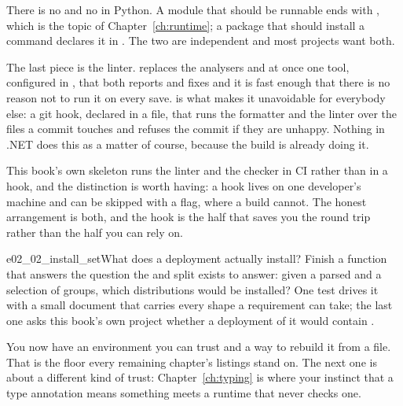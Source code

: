 \begin{csbox}
There is no  and no  in Python. A module that
should be runnable ends with , which
is the topic of Chapter~\ref{ch:runtime}; a package that should install a
command declares it in . The two are independent and
most projects want both.
\end{csbox}

\noindent
The last piece is the linter.  replaces the analysers and
 at once \dash{} one tool, configured in
, that both reports and fixes \dash{} and it is fast
enough that there is no reason not to run it on every save. 
is what makes it unavoidable for everybody else: a git hook, declared in a
file, that runs the formatter and the linter over the files a commit touches
and refuses the commit if they are unhappy. Nothing in .NET does this as a
matter of course, because the build is already doing it.

This book's own skeleton runs the linter and the checker in CI rather than in
a hook, and the distinction is worth having: a hook lives on one developer's
machine and can be skipped with a flag, where a build cannot. The honest
arrangement is both, and the hook is the half that saves you the round trip
rather than the half you can rely on.

\begin{exercise}{e02_02_install_set}{What does a deployment actually install?}
Finish a function that answers the question the \code{[project]} and
 split exists to answer: given a parsed
 and a selection of groups, which distributions would be
installed? One test drives it with a small document that carries every shape a
requirement can take; the last one asks this book's own project whether a
deployment of it would contain .
\end{exercise}

\noindent
You now have an environment you can trust and a way to rebuild it from a file.
That is the floor every remaining chapter's listings stand on. The next one is
about a different kind of trust: Chapter~\ref{ch:typing} is where your instinct
that a type annotation means something meets a runtime that never checks one.
